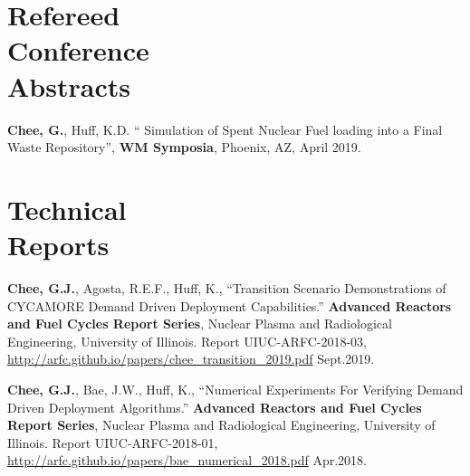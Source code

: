 \documentclass[margin,line]{resume}
\begin{document}
\begin{resume}
    \section{\mysidestyle Refereed\\Conference\\Abstracts}
    \begin{bibenum} 
    \item \textbf{Chee, G.}, Huff, K.D. `` Simulation of Spent Nuclear Fuel loading into a Final Waste 
    Repository'', \textbf{WM Symposia}, Phoenix, AZ, April 2019.
    \end{bibenum}
    \vspace{0.5em}
    \section{\mysidestyle Technical\\Reports}
    \begin{bibenum} 
        \item \textbf{Chee, G.J.}, Agosta, R.E.F., Huff, K., ``Transition Scenario Demonstrations of CYCAMORE Demand Driven Deployment Capabilities.'' 
        \textbf{Advanced Reactors and Fuel Cycles Report Series}, Nuclear Plasma and Radiological Engineering, University of Illinois.  Report 
        UIUC-ARFC-2018-03, 
        \url{http://arfc.github.io/papers/chee_transition_2019.pdf} 
        Sept.2019.  
      \item \textbf{Chee, G.J.}, Bae, J.W., Huff, K., ``Numerical Experiments 
              For Verifying Demand Driven Deployment Algorithms.'' 
              \textbf{Advanced Reactors and Fuel Cycles Report Series}, Nuclear Plasma and Radiological Engineering, University of Illinois.  Report 
              UIUC-ARFC-2018-01, 
              \url{http://arfc.github.io/papers/bae_numerical_2018.pdf} 
              Apr.2018.  
    \end{bibenum}

\end{resume}
\end{document}
